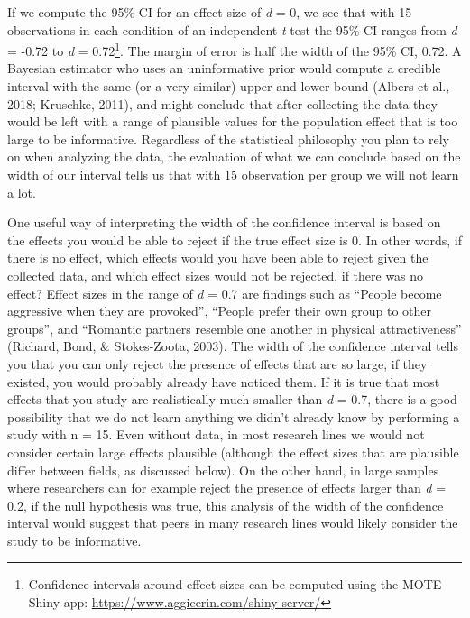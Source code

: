 \documentclass[
  english,
  ,jou, a4paper,floatsintext]{apa6}
\begin{document}
If we compute the 95\% CI for an effect size of \emph{d} = 0, we see that with 15 observations in each condition of an independent \emph{t} test the 95\% CI ranges from \emph{d} = -0.72 to \emph{d} = 0.72\footnote{Confidence intervals around effect sizes can be computed using the MOTE Shiny app: \url{https://www.aggieerin.com/shiny-server/}}. The margin of error is half the width of the 95\% CI, 0.72. A Bayesian estimator who uses an uninformative prior would compute a credible interval with the same (or a very similar) upper and lower bound (Albers et al., 2018; Kruschke, 2011), and might conclude that after collecting the data they would be left with a range of plausible values for the population effect that is too large to be informative. Regardless of the statistical philosophy you plan to rely on when analyzing the data, the evaluation of what we can conclude based on the width of our interval tells us that with 15 observation per group we will not learn a lot.

One useful way of interpreting the width of the confidence interval is based on the effects you would be able to reject if the true effect size is 0. In other words, if there is no effect, which effects would you have been able to reject given the collected data, and which effect sizes would not be rejected, if there was no effect? Effect sizes in the range of \emph{d} = 0.7 are findings such as ``People become aggressive when they are provoked'', ``People prefer their own group to other groups'', and ``Romantic partners resemble one another in physical attractiveness'' (Richard, Bond, \& Stokes-Zoota, 2003). The width of the confidence interval tells you that you can only reject the presence of effects that are so large, if they existed, you would probably already have noticed them. If it is true that most effects that you study are realistically much smaller than \emph{d} = 0.7, there is a good possibility that we do not learn anything we didn't already know by performing a study with n = 15. Even without data, in most research lines we would not consider certain large effects plausible (although the effect sizes that are plausible differ between fields, as discussed below). On the other hand, in large samples where researchers can for example reject the presence of effects larger than \emph{d} = 0.2, if the null hypothesis was true, this analysis of the width of the confidence interval would suggest that peers in many research lines would likely consider the study to be informative.
\end{document}
